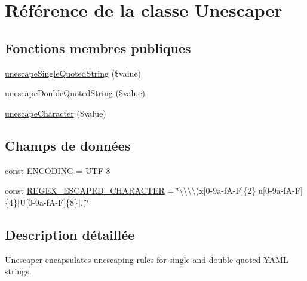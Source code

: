 \hypertarget{class_symfony_1_1_component_1_1_yaml_1_1_unescaper}{}\section{Référence de la classe Unescaper}
\label{class_symfony_1_1_component_1_1_yaml_1_1_unescaper}
\subsection*{Fonctions membres publiques}
\begin{DoxyCompactItemize}
\item 
\hyperlink{class_symfony_1_1_component_1_1_yaml_1_1_unescaper_a3f2364220b103d0a24d2fdc2ec7a262a}{unescape\+Single\+Quoted\+String} (\$value)
\item 
\hyperlink{class_symfony_1_1_component_1_1_yaml_1_1_unescaper_a41936d6f3adf35b5833be5fe1adc9d39}{unescape\+Double\+Quoted\+String} (\$value)
\item 
\hyperlink{class_symfony_1_1_component_1_1_yaml_1_1_unescaper_a64e26646c423654a7d009c06458eba6d}{unescape\+Character} (\$value)
\end{DoxyCompactItemize}
\subsection*{Champs de données}
\begin{DoxyCompactItemize}
\item 
const \hyperlink{class_symfony_1_1_component_1_1_yaml_1_1_unescaper_ac469db39bd848179bdd0d025f92fece3}{E\+N\+C\+O\+D\+I\+NG} = \textquotesingle{}U\+TF-\/8\textquotesingle{}
\item 
const \hyperlink{class_symfony_1_1_component_1_1_yaml_1_1_unescaper_a5356e3ed7b9c99d134587dc04ca30e45}{R\+E\+G\+E\+X\+\_\+\+E\+S\+C\+A\+P\+E\+D\+\_\+\+C\+H\+A\+R\+A\+C\+T\+ER} = \char`\"{}\textbackslash{}\textbackslash{}\textbackslash{}\textbackslash{}(x\mbox{[}0-\/9a-\/f\+A-\/\+F\mbox{]}\{2\}$\vert$u\mbox{[}0-\/9a-\/f\+A-\/\+F\mbox{]}\{4\}$\vert$\+U\mbox{[}0-\/9a-\/f\+A-\/\+F\mbox{]}\{8\}$\vert$.)\char`\"{}
\end{DoxyCompactItemize}


\subsection{Description détaillée}
\hyperlink{class_symfony_1_1_component_1_1_yaml_1_1_unescaper}{Unescaper} encapsulates unescaping rules for single and double-\/quoted Y\+A\+ML strings.

